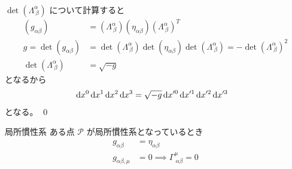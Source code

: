 \documentclass[uplatex,dvipdfmx,a4paper,11pt]{jlreq}
\makeatletter
\theoremstyle{definition}
\renewenvironment{proof}[1][\proofname]{\par
  \normalfont
  \topsep6\p@\@plus6\p@ \trivlist
  \item[\hskip\labelsep{\bfseries #1}\@addpunct{\bfseries}]\ignorespaces\quad\par
}{%
  \qed\endtrivlist\@endpefalse
}
\renewcommand\proofname{証明}
\makeatother
\begin{document}
\begin{proof}
\begin{align}
  \end{align}
  $\det(\Lambda^\alpha_{\ \beta})$ について計算すると
  \begin{align}
    (g_{\alpha\beta})              & = (\Lambda^\alpha_{\ \beta})(\eta_{\alpha\beta})(\Lambda^\alpha_{\ \beta})^T                                               \\
    g = \det(g_{\alpha\beta})      & = \det(\Lambda^\alpha_{\ \beta})\det(\eta_{\alpha\beta})\det(\Lambda^\alpha_{\ \beta}) = -\det(\Lambda^\alpha_{\ \beta})^2 \\
    \det(\Lambda^\alpha_{\ \beta}) & = \sqrt{-g}
  \end{align}
  となるから
  \begin{align}
    \dl{x^0}\dl{x^1}\dl{x^2}\dl{x^3} & = \sqrt{-g}\dl{x'^0}\dl{x'^1}\dl{x'^2}\dl{x'^3}
  \end{align}
  となる。
\end{proof}

\begin{itembox}[l]{局所慣性系}
  ある点 $\mathscr{P}$ が局所慣性系となっているとき
  \begin{align}
    g_{\alpha\beta}     & = \eta_{\alpha\beta}                        \\
    g_{\alpha\beta,\mu} & = 0 \implies \Gamma^\mu_{\ \alpha\beta} = 0
  \end{align}
\end{itembox}
\end{document}
